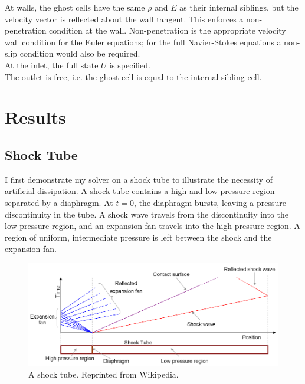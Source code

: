 \documentclass[paper=a4, fontsize=11pt]{scrartcl}
\numberwithin{equation}{section}        %
\numberwithin{figure}{section}          %
\numberwithin{table}{section}               %
\begin{document}
At walls, the ghost cells have the same $\rho$ and $E$ as their internal siblings, but the velocity vector is reflected about the wall tangent. This enforces a non-penetration condition at the wall. Non-penetration is the appropriate velocity wall condition for the Euler equations; for the full Navier-Stokes equations a non-slip condition would also be required.\\

At the inlet, the full state $U$ is specified.\\

The outlet is free, i.e. the ghost cell is equal to the internal sibling cell.\\


\section{Results}
\subsection{Shock Tube}
I first demonstrate my solver on a shock tube to illustrate the necessity of artificial dissipation. A shock tube contains a high and low pressure region separated by a diaphragm. At $t=0$, the diaphragm bursts, leaving a pressure discontinuity in the tube. A shock wave travels from the discontinuity into the low pressure region, and an expansion fan travels into the high pressure region. A region of uniform, intermediate pressure is left between the shock and the expansion fan.

\begin{figure}[H]
    \centering
    \includegraphics[width = 0.8 \textwidth]{figures/shock_tube.png}
    \caption{A shock tube. Reprinted from Wikipedia.}
    \label{fig:shock_tube}
\end{figure}
\end{document}
